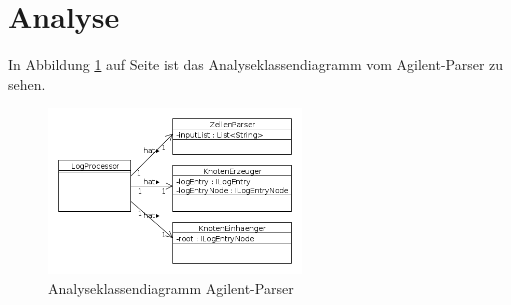 \section{Analyse}\label{Analyse}
In Abbildung \ref{fig:Analyseklassendiagramm} auf Seite \pageref{fig:Analyseklassendiagramm} ist das Analyseklassendiagramm vom Agilent-Parser zu sehen.

\begin{figure}[htp]
\centering
\includegraphics[width=0.6\textwidth]{Ingo/Bilder/Analyseklassendiagramm.png}
\caption{Analyseklassendiagramm Agilent-Parser}
\label{fig:Analyseklassendiagramm}
\end{figure}